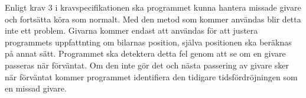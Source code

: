 Enligt krav 3 i kravspecifikationen ska programmet kunna hantera missade givare
och fortsätta köra som normalt. Med den metod som kommer användas blir detta inte ett problem.
Givarna kommer endast att användas för att justera programmets uppfattnting om bilarnas position, 
själva positionen ska beräknas på annat sätt.  Programmet ska detektera detta
fel genom att  se om en givare passeras när förväntat. Om den inte gör det och nästa
passering av givare sker när förväntat kommer programmet
identifiera den tidigare tidsfördröjningen som en missad givare.
